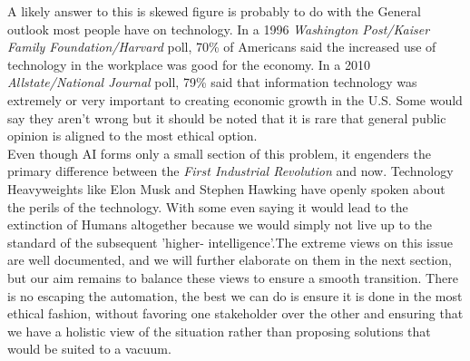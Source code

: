 	A likely answer to this is skewed figure is probably to do with the General outlook most people have on technology. In a 1996 \textit{Washington Post/Kaiser Family Foundation/Harvard} poll, 70\% of Americans said the increased use of technology in the workplace was good for the economy. In a 2010 \textit{Allstate/National Journal} poll, 79\% said that information technology was extremely or very important to creating economic growth in the U.S. Some would say they aren't wrong but it should be noted that it is rare that general public opinion is aligned to the most ethical option.\\
	Even though AI forms only a small section of this problem, it engenders the primary difference between the \textit{First Industrial Revolution} and now. Technology Heavyweights like Elon Musk and Stephen Hawking have openly spoken about the perils of the technology. With some even saying it would lead to the extinction of Humans altogether because we would simply not live up to the standard of the subsequent 'higher- intelligence'.The extreme views on this issue are well documented, and we will further elaborate on them in the next section, but our aim remains to balance these views to ensure a smooth transition. There is no escaping the automation, the best we can do is ensure it is done in the most ethical fashion, without favoring one stakeholder over the other and ensuring that we have a holistic view of the situation rather than proposing solutions that would be suited to a vacuum.

